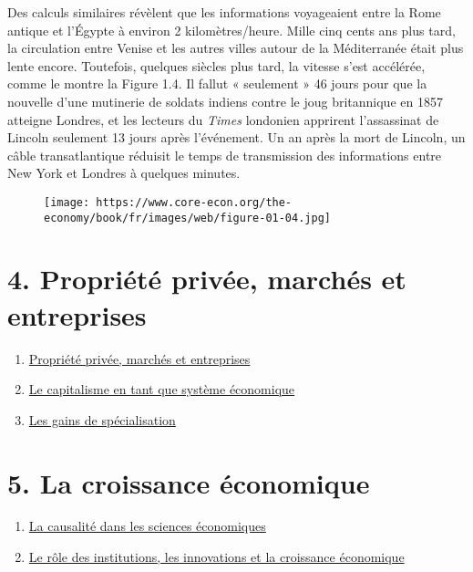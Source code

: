 \documentclass[11pt]{amsart}
\begin{document}
Des calculs similaires révèlent que les informations voyageaient entre la Rome antique et l’Égypte à environ 2 kilomètres/heure. Mille cinq cents ans plus tard, la circulation entre Venise et les autres villes autour de la Méditerranée était plus lente encore. Toutefois, quelques siècles plus tard, la vitesse s’est accélérée, comme le montre la Figure 1.4. Il fallut « seulement » 46 jours pour que la nouvelle d’une mutinerie de soldats indiens contre le joug britannique en 1857 atteigne Londres, et les lecteurs du \emph{Times} londonien apprirent l’assassinat de Lincoln seulement 13 jours après l’événement. Un an après la mort de Lincoln, un câble transatlantique réduisit le temps de transmission des informations entre New York et Londres à quelques minutes.


\begin{figure}[h]{}
\centering\texttt{[image: https://www.core-econ.org/the-economy/book/fr/images/web/figure-01-04.jpg]}
\caption{}

\end{figure}

\hypertarget{x-4.-propriété-privée,-marchés-et-entreprises}{\section*{4. Propriété privée, marchés et entreprises}}
\begin{enumerate}

\item{\href{https://www.core-econ.org/the-economy/book/fr/text/01.html#16-une-d%C3%A9finition-du-capitalisme-propri%C3%A9t%C3%A9-priv%C3%A9e-march%C3%A9s-et-entreprises}{Propriété privée, marchés et entreprises}}

\item{\href{https://www.core-econ.org/the-economy/book/fr/text/01.html#17-le-capitalisme-en-tant-que-syst%C3%A8me-%C3%A9conomique}{Le capitalisme en tant que système économique}}

\item{\href{https://www.core-econ.org/the-economy/book/fr/text/01.html#18-les-gains-de-la-sp%C3%A9cialisation}{Les gains de spécialisation}}

\end{enumerate}


\hypertarget{x-5.-la-croissance-économique}{\section*{5. La croissance économique}}
\begin{enumerate}

\item{\href{https://www.core-econ.org/the-economy/book/fr/text/01.html#19-capitalisme-causalit%C3%A9-et-la-crosse-de-hockey-de-lhistoire}{La causalité dans les sciences économiques}}

\item{\href{https://www.core-econ.org/the-economy/book/fr/text/01.html#110-les-diff%C3%A9rents-capitalismes-institutions-%C3%A9tat-et-%C3%A9conomie}{Le rôle des institutions, les innovations et la croissance économique}}

\end{enumerate}
\end{document}
